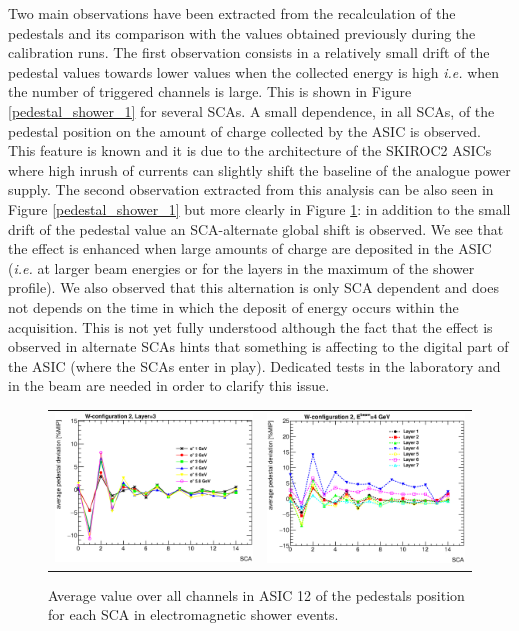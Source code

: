 \documentclass[a4paper,11pt]{article}
\begin{document}
Two main observations have been extracted from the recalculation of the pedestals and its comparison
with the values obtained previously during the calibration runs. The first observation
consists in a relatively small 
drift of the pedestal values
towards lower values when the collected energy is high {\it i.e.} when the number of triggered channels is large.
This is shown in Figure \ref{pedestal_shower_1} for several SCAs.
A small dependence, in all SCAs, of the pedestal position on the amount of charge collected by the
ASIC is observed.
This feature is known and it is due to the architecture of the SKIROC2 ASICs 
where high inrush of currents can slightly shift the baseline of the analogue power supply. 
The second observation extracted from this analysis can be also seen in Figure \ref{pedestal_shower_1} but
more clearly in Figure \ref{pedestal_shower_2}: in addition
to the small drift of the pedestal value an SCA-alternate global shift
is observed. We see that the effect is enhanced when large amounts of charge
are deposited in the ASIC ({\it i.e.} at larger beam energies or for the layers in the maximum of the shower
profile). We also observed that this alternation is only SCA dependent and does not depends
on the time in which the deposit of energy occurs within the acquisition.
This is not yet fully understood although the fact that the effect is observed in
alternate SCAs hints that something is affecting to the digital part of the ASIC 
(where the SCAs enter in play).
Dedicated tests in the laboratory and in the beam are needed in order to clarify this issue.

\begin{figure}[!t]
  \centering 
    \begin{tabular}{ll}
      \includegraphics[width=2.8in]{../figs/pedestal/pedestal_deviation_layer3.eps} & \includegraphics[width=2.8in]{../figs/pedestal/pedestal_deviation_4GeV.eps} \\
    \end{tabular}
    \caption{Average value over all channels in ASIC 12 of the pedestals position for each SCA in electromagnetic shower events.}
\label{pedestal_shower_2}
\end{figure}
\end{document}
